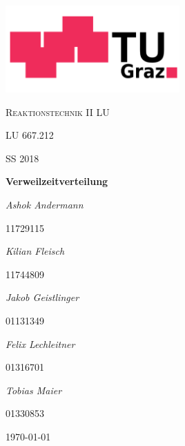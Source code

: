 \documentclass[12pt,liststotoc]{report}
\begin{document}
\setcounter{secnumdepth}{5}
\setcounter{tocdepth}{5}

\begin{titlepage}
	\centering
	\includegraphics[width=0.5\textwidth]{Graphics/TU_Graz.pdf}\par\vspace{1cm}
	
	{\scshape\LARGE Reaktionstechnik II LU  \par}
	\vspace{1cm}
	{\scshape\Large LU 667.212\par}
	{\scshape \large SS 2018\par}
	\vspace{0.5cm}
	{\huge\bfseries Verweilzeitverteilung\par}
	\vspace{0.5cm}

	{\LARGE \itshape Ashok Andermann\par}
	{\large 11729115\par}\vspace{0.5cm}
	
	{\LARGE \itshape Kilian Fleisch\par}
	{\large 11744809\par}\vspace{0.5cm}
	
		
	{\LARGE \itshape Jakob Geistlinger\par}
	{\large 01131349\par}\vspace{0.5cm}
	
	{\LARGE \itshape Felix Lechleitner\par}
	{\large 01316701\par}\vspace{0.5cm}

	{\LARGE \itshape Tobias Maier\par}
	{\large 01330853\par}\vspace{0.5cm}
	\vfill

	{\large \today\par}
\end{titlepage}
\end{document}
